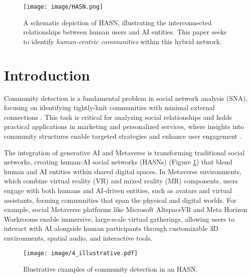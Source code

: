 \begin{figure}[t]
    \centering
    \texttt{[image: image/HASN.png]}
    \caption{A schematic depiction of HASN, illustrating the interconnected relationships between human users and AI entities. This paper seeks to identify \textit{human-centric communities} within this hybrid network.}
    \label{figure:hasn}
\end{figure}


\section{Introduction}
\label{sec:introduction}

Community detection is a fundamental problem in social network analysis (SNA), focusing on identifying tightly-knit communities with minimal external connections \cite{mcpherson2001birds}\cite{su2022comprehensive}\cite{jin2021survey}. This task is critical for analyzing social relationships and holds practical applications in marketing and personalized services, where insights into community structures enable targeted strategies and enhance user engagement \cite{du2007community}\cite{umrawal2023community}.


The integration of generative AI and Metaverse is transforming traditional social networks, creating human-AI social networks (HASNs) (Figure \ref{figure:hasn}) that blend human and AI entities within shared digital spaces. In Metaverse environments, which combine virtual reality (VR) and mixed reality (MR) components, users engage with both humans and AI-driven entities, such as avatars and virtual assistants, forming communities that span the physical and digital worlds. For example, social Metaverse platforms like Microsoft AltspaceVR \cite{meijers2021globalxr} and Meta Horizon Workrooms \cite{meta2023workrooms} enable immersive, large-scale virtual gatherings, allowing users to interact with AI alongside human participants through customizable 3D environments, spatial audio, and interactive tools.

\begin{figure*}[t]
    \centering
    \texttt{[image: image/4\_illustrative.pdf]}
    \caption{Illustrative examples of community detection in an HASN.}
    \label{illustrative}
\end{figure*}

